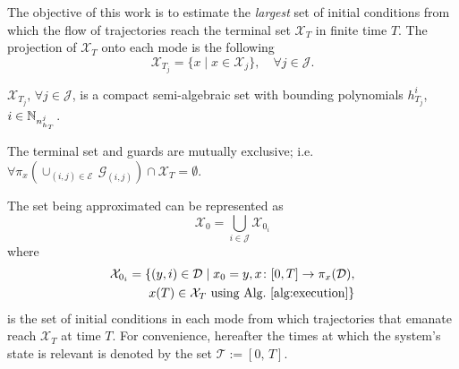 The objective of this work is to estimate the {\em largest} set of initial conditions from which the flow of trajectories reach the terminal set $\mathcal X_T$ in finite time $T$. The projection of $\mathcal X_T$ onto each mode is the following
$$\mathcal X_{T_j}=\{x\mid x\in \mathcal X_j\},\phantom{10}\forall j\in \mathcal J.$$
\begin{assump}
  $\mathcal X_{T_j},\,\forall j\in \mathcal J$, is a compact semi-algebraic set with bounding polynomials $h_{T_j}^i$, $i\in \mathbb{N}_{n_{h_T}^j}$.
\end{assump}
\begin{assump}
The terminal set and guards are mutually exclusive; i.e.
  $\forall \pi_{x}\left(\cup_{(i,j)\in \mathcal E}\,\mathcal G_{(i,j)}\right)\cap \mathcal X_T=\emptyset$.
  \label{assump:guards_terminal}
\end{assump}
The set being approximated can be represented as
$$\mathcal X_0=\bigcup_{i\in \mathcal J} \mathcal X_{0_i}$$
where
\begin{align}
\begin{aligned}
    \mathcal X_{0_i}=\{(y,i)\in \mathcal D\mid x_0=y, x\colon [0,T]\rightarrow \pi_{x}(\mathcal D),\\\,x(T)\in \mathcal X_T \text{ using Alg.~\ref{alg:execution}}\}
\end{aligned}
\end{align}
is the set of initial conditions in each mode from which trajectories that emanate reach $\mathcal X_T$ at time $T$. For convenience, hereafter the times at which the system's state is relevant is denoted by the set $\mathcal T:=[0,\,T]$.